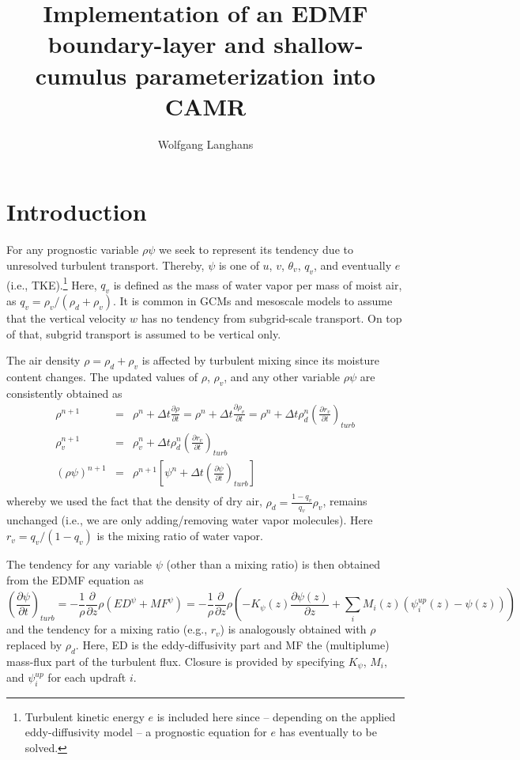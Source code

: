\documentclass[dvipdfmx,a4paper,10pt]{article}
\title{Implementation of an EDMF boundary-layer and shallow-cumulus parameterization into CAMR}
\author{Wolfgang Langhans}
\begin{document}
\maketitle
\tableofcontents

\section{Introduction}\label{se:intro}

For any prognostic variable $\rho\psi$ we seek to represent its tendency due to unresolved turbulent transport. Thereby, $\psi$ is one of $u$, $v$, $\theta_v$, $q_v$, and eventually $e$ (i.e., TKE).\footnote{Turbulent kinetic energy $e$ is included here since -- depending on the applied eddy-diffusivity model -- a prognostic equation for $e$ has eventually to be solved.} Here, $q_v$ is defined as the mass of water vapor per mass of moist air, as $q_v=\rho_v/(\rho_d+\rho_v)$. It is common in GCMs and mesoscale models to assume that the vertical velocity $w$ has no tendency from subgrid-scale transport. On top of that, subgrid transport is assumed to be vertical only. 

The air density $\rho=\rho_d+\rho_v$ is affected by turbulent mixing since its moisture content changes. The updated values of $\rho$, $\rho_v$, and any other variable $\rho \psi$ are consistently obtained as 
\begin{eqnarray}
\rho^{n+1}&=&\rho^n + \Delta t \frac{\partial \rho}{\partial t}=\rho^n + \Delta t \frac{\partial \rho_v}{\partial t}=\rho^n + \Delta t \rho_d^n\left(\frac{\partial r_v}{\partial t}\right)_{turb} \\
\rho_v^{n+1}&=&\rho_v^n + \Delta t \rho_d^n\left(\frac{\partial r_v}{\partial t}\right)_{turb}\\
 (\rho\psi)^{n+1} &=& \rho^{n+1}\left[\psi^n + \Delta t \left(\frac{\partial \psi}{\partial t}\right)_{turb}\right]\\
\end{eqnarray}
whereby we used the fact that the density of dry air, $\rho_d=\frac{1-q_v}{q_v}\rho_v$, remains unchanged (i.e., we are only adding/removing water vapor molecules). Here $r_v=q_v/(1-q_v)$ is the mixing ratio of water vapor.  

The tendency for any variable $\psi$ (other than a mixing ratio) is then obtained from the EDMF equation as
\begin{equation}\label{eqn:tendency}
 \left(\frac{\partial \psi}{\partial t}\right)_{turb} =-\frac{1}{\rho}\frac{\partial }{\partial z} \rho \left( ED^{\psi} + MF^{\psi}\right) = -\frac{1}{\rho}\frac{\partial }{\partial z} \rho\left( -K_{\psi}(z)\frac{\partial \psi(z)}{\partial z} + \sum_i M_i(z) (\psi^{up}_i(z) - \psi(z) )\right)
\end{equation}
and the tendency for a mixing ratio (e.g., $r_v$) is analogously obtained with $\rho$ replaced by $\rho_d$. Here, ED is the eddy-diffusivity part and MF the (multiplume) mass-flux part of the turbulent flux. Closure is provided by specifying $K_{\psi}$, $M_i$, and $\psi^{up}_i$ for each updraft $i$.
\end{document}
